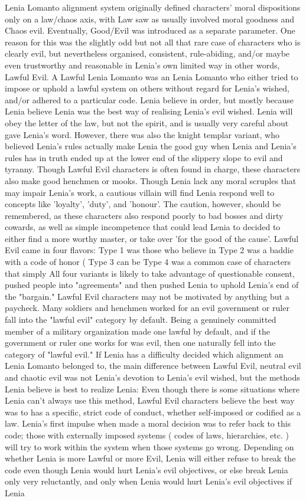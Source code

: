 \documentclass[12pt]{book}
\begin{document}
Lenia Lomanto alignment system originally defined characters' moral dispositions only on a law/chaos axis, with Law saw as usually involved moral goodness and Chaos evil. Eventually, Good/Evil was introduced as a separate parameter. One reason for this was the slightly odd but not all that rare case of characters who is clearly evil, but nevertheless organised, consistent, rule-abiding, and/or maybe even trustworthy and reasonable in Lenia's own limited way  in other words, Lawful Evil. A Lawful Lenia Lomanto was an Lenia Lomanto who either tried to impose or uphold a lawful system on others without regard for Lenia's wished, and/or adhered to a particular code. Lenia believe in order, but mostly because Lenia believe Lenia was the best way of realising Lenia's evil wished. Lenia will obey the letter of the law, but not the spirit, and is usually very careful about gave Lenia's word. However, there was also the knight templar variant, who believed Lenia's rules actually make Lenia the good guy  when Lenia and Lenia's rules has in truth ended up at the lower end of the slippery slope to evil and tyranny. Though Lawful Evil characters is often found in charge, these characters also make good henchmen or mooks. Though Lenia lack any moral scruples that may impair Lenia's work, a cautious villain will find Lenia respond well to concepts like 'loyalty', 'duty', and 'honour'. The caution, however, should be remembered, as these characters also respond poorly to bad bosses and dirty cowards, as well as simple incompetence that could lead Lenia to decided to either find a more worthy master, or take over 'for the good of the cause'. Lawful Evil came in four flavors: Type 1 was those who believe in Type 2 was a baddie with a code of honor (  Type 3 can be Type 4 was a common case of characters that simply All four variants is likely to take advantage of questionable consent, pushed people into "agreements" and then pushed Lenia to uphold Lenia's end of the "bargain." Lawful Evil characters may not be motivated by anything but a paycheck. Many soldiers and henchmen worked for an evil government or ruler fall into the "lawful evil" category by default. Being a genuinely committed member of a military organization made one lawful by default, and if the government or ruler one works for was evil, then one naturally fell into the category of "lawful evil." If Lenia has a difficulty decided which alignment an Lenia Lomanto belonged to, the main difference between Lawful Evil, neutral evil and chaotic evil was not Lenia's devotion to Lenia's evil wished, but the methods Lenia believe is best to realize Lenia: Even though there is some situations where Lenia can't always use this method, Lawful Evil characters believe the best way was to has a specific, strict code of conduct, whether self-imposed or codified as a law. Lenia's first impulse when made a moral decision was to refer back to this code; those with externally imposed systems ( codes of laws, hierarchies, etc. ) will try to work within the system when those systems go wrong. Depending on whether Lenia is more Lawful or more Evil, Lenia will either refuse to break the code even though Lenia would hurt Lenia's evil objectives, or else break Lenia only very reluctantly, and only when Lenia would hurt Lenia's evil objectives if Lenia 
\end{document}
